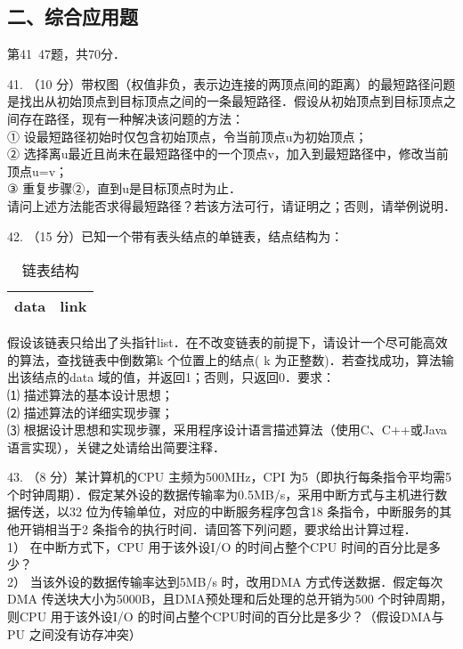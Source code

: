 \subsection{二、综合应用题}
第41~47题，共70分．

41. （10 分）带权图（权值非负，表示边连接的两顶点间的距离）的最短路径问题是找出从初始顶点到目标顶点之间的一条最短路径．假设从初始顶点到目标顶点之间存在路径，现有一种解决该问题的方法： \\
① 设最短路径初始时仅包含初始顶点，令当前顶点u为初始顶点； \\
② 选择离u最近且尚未在最短路径中的一个顶点v，加入到最短路径中，修改当前顶点u=v； \\
③ 重复步骤②，直到u是目标顶点时为止． \\
请问上述方法能否求得最短路径？若该方法可行，请证明之；否则，请举例说明．

42. （15 分）已知一个带有表头结点的单链表，结点结构为：
\begin{table}[ht]
\centering
\caption{链表结构}\label{CSN09_tab1}
\begin{tabular}{|c|c|}
\hline
data & link \\
\hline
\end{tabular}
\end{table}
假设该链表只给出了头指针list．在不改变链表的前提下，请设计一个尽可能高效的算法，查找链表中倒数第k 个位置上的结点( k 为正整数)．若查找成功，算法输出该结点的data 域的值，并返回1；否则，只返回0．要求： \\
⑴ 描述算法的基本设计思想； \\
⑵ 描述算法的详细实现步骤； \\
⑶ 根据设计思想和实现步骤，采用程序设计语言描述算法（使用C、C++或Java 语言实现），关键之处请给出简要注释．

43. （8 分）某计算机的CPU 主频为500MHz，CPI 为5（即执行每条指令平均需5 个时钟周期）．假定某外设的数据传输率为0.5MB/s，采用中断方式与主机进行数据传送，以32 位为传输单位，对应的中断服务程序包含18 条指令，中断服务的其他开销相当于2 条指令的执行时间．请回答下列问题，要求给出计算过程． \\
1） 在中断方式下，CPU 用于该外设I/O 的时间占整个CPU 时间的百分比是多少？ \\
2） 当该外设的数据传输率达到5MB/s 时，改用DMA 方式传送数据．假定每次DMA 传送块大小为5000B，且DMA预处理和后处理的总开销为500 个时钟周期，则CPU 用于该外设I/O 的时间占整个CPU时间的百分比是多少？（假设DMA与PU 之间没有访存冲突）

